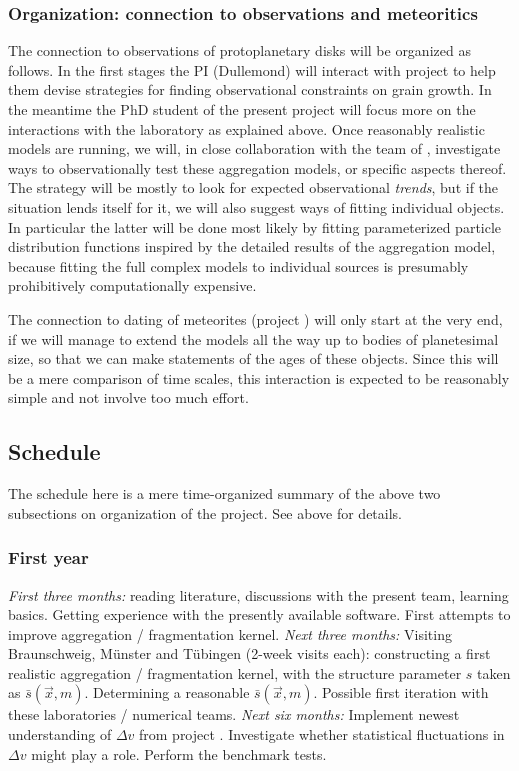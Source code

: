 \subsubsection{Organization: connection to observations and meteoritics}
The connection to observations of protoplanetary disks will be organized
as follows. In the first stages the PI (Dullemond) will interact with
project \projwolf{} to help them devise strategies for finding observational
constraints on grain growth. In the meantime the PhD student of the
present project will focus more on the interactions with the laboratory
as explained above. Once reasonably realistic models are running, we
will, in close collaboration with the team of \projwolf{}, investigate
ways to observationally test these aggregation models, or specific 
aspects thereof. The strategy will be mostly to look for expected
observational {\em trends}, but if the situation lends itself for it,
we will also suggest ways of fitting individual objects. In particular
the latter will be done most likely by fitting parameterized particle
distribution functions inspired by the detailed results of the
aggregation model, because fitting the full complex models to individual
sources is presumably prohibitively computationally expensive.

The connection to dating of meteorites (project \projtrie{}) will only start
at the very end, if we will manage to extend the models all the way up to
bodies of planetesimal size, so that we can make statements of the ages of
these objects. Since this will be a mere comparison of time scales, this
interaction is expected to be reasonably simple and not involve too much
effort.

\subsection{Schedule}
The schedule here is a mere time-organized summary of the above
two subsections on organization of the project. See above for
details.

\subsubsection{First year}
{\em First three months:} reading literature, discussions with the present
team, learning basics. Getting experience with the presently available
software. First attempts to improve aggregation / fragmentation kernel. {\em
Next three months:} Visiting Braunschweig, M\"unster and T\"ubingen (2-week
visits each): constructing a first realistic aggregation / fragmentation
kernel, with the structure parameter $s$ taken as $\bar s(\vec
x,m)$. Determining a reasonable $\bar s(\vec x,m)$. Possible first iteration
with these laboratories / numerical teams.  {\em Next six months:}
Implement newest understanding of $\Delta v$ from project
\projklahr{}. Investigate whether statistical fluctuations in $\Delta v$
might play a role. Perform the benchmark tests.

